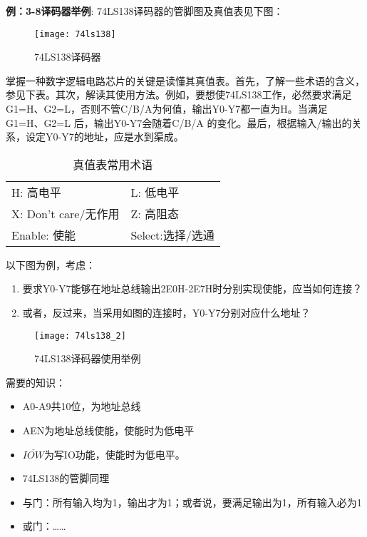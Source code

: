 \textbf{例：3-8译码器举例}: 74LS138译码器的管脚图及真值表见下图：

\begin{figure}[h]
  \centering
  \texttt{[image: 74ls138]}\\
  \caption{74LS138译码器}\label{fig:138_1}
\end{figure}

掌握一种数字逻辑电路芯片的关键是读懂其真值表。首先，了解一些术语的含义，参见下表。其次，解读其使用方法。例如，要想使74LS138工作，必然要求满足G1=H、G2=L，否则不管C/B/A为何值，输出Y0-Y7都一直为H。当满足G1=H、G2=L 后，输出Y0-Y7会随着C/B/A 的变化。最后，根据输入/输出的关系，设定Y0-Y7的地址，应是水到渠成。

\begin{table}[h]
  \centering
\begin{tabular}{|l|l|}
  \hline
  H: 高电平 & L: 低电平 \\
  X: Don't care/无作用 & Z: 高阻态 \\
  Enable: 使能 & Select:选择/选通 \\
  \hline
\end{tabular}
  \caption{真值表常用术语}\label{tab:2.2}
\end{table}


以下图为例，考虑：
\begin{enumerate}
  \item 要求Y0-Y7能够在地址总线输出2E0H-2E7H时分别实现使能，应当如何连接？
  \item 或者，反过来，当采用如图的连接时，Y0-Y7分别对应什么地址？
\end{enumerate}


\begin{figure}[h]
  \centering
  \texttt{[image: 74ls138\_2]}\\
  \caption{74LS138译码器使用举例}\label{fig:138_2}
\end{figure}




需要的知识：
\begin{itemize}
  \item A0-A9共10位，为地址总线
  \item AEN为地址总线使能，使能时为低电平
  \item $\overline{IOW}$为写IO功能，使能时为低电平。
  \item 74LS138的管脚同理
  \item 与门：所有输入均为1，输出才为1；或者说，要满足输出为1，所有输入必为1
  \item 或门：……
\end{itemize}

